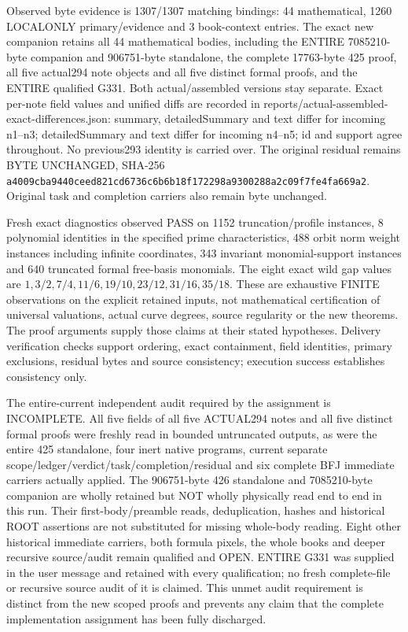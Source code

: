 \documentclass[11pt]{article}
\begin{document}
Observed byte evidence is 1307/1307 matching bindings: 44 mathematical,
1260 LOCALONLY primary/evidence and 3 book-context entries. The exact new
companion retains all 44 mathematical bodies, including the ENTIRE
7085210-byte companion and 906751-byte standalone, the complete 17763-byte
425 proof, all five actual294 note objects and all five distinct formal
proofs, and the ENTIRE qualified G331. Both actual/assembled versions stay
separate. Exact per-note field values and unified diffs are recorded in
reports/actual-assembled-exact-differences.json: summary, detailedSummary
and text differ for incoming n1--n3; detailedSummary and text differ for
incoming n4--n5; id and support agree throughout. No previous293 identity
is carried over. The original residual remains BYTE UNCHANGED, SHA-256
\texttt{a4009cba9440ceed821cd6736c6b6b18f172298a9300288a2c09f7fe4fa669a2}.
Original task and completion carriers also remain byte unchanged.

Fresh exact diagnostics observed PASS on 1152 truncation/profile instances,
8 polynomial identities in the specified prime characteristics, 488 orbit
norm weight instances including infinite coordinates, 343 invariant
monomial-support instances and 640 truncated formal free-basis monomials.
The eight exact wild gap values are $1,3/2,7/4,11/6,19/10,23/12,31/16,35/18$.
These are exhaustive FINITE observations on the explicit retained inputs,
not mathematical certification of universal valuations, actual curve degrees,
source regularity or the new theorems. The proof arguments supply those
claims at their stated hypotheses. Delivery verification checks support
ordering, exact containment, field identities, primary exclusions, residual
bytes and source consistency; execution success establishes consistency only.

The entire-current independent audit required by the assignment is
INCOMPLETE. All five fields of all five ACTUAL294 notes and all five
distinct formal proofs were freshly read in bounded untruncated outputs,
as were the entire 425 standalone, four inert native programs, current
separate scope/ledger/verdict/task/completion/residual and six complete
BFJ immediate carriers actually applied. The 906751-byte 426 standalone
and 7085210-byte companion are wholly retained but NOT wholly physically
read end to end in this run. Their first-body/preamble reads, deduplication,
hashes and historical ROOT assertions are not substituted for missing
whole-body reading. Eight other historical immediate carriers, both
formula pixels, the whole books and deeper recursive source/audit remain
qualified and OPEN. ENTIRE G331 was supplied in the user message and
retained with every qualification; no fresh complete-file or recursive
source audit of it is claimed. This unmet audit requirement is distinct
from the new scoped proofs and prevents any claim that the complete
implementation assignment has been fully discharged.
\end{document}

